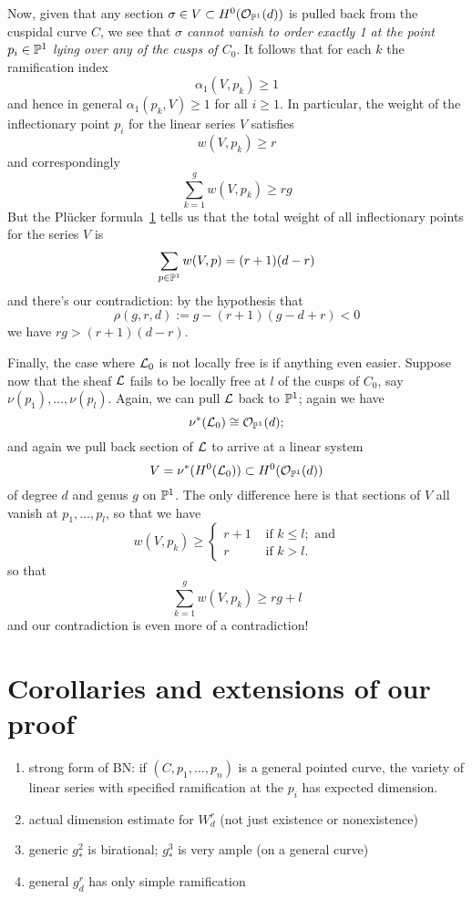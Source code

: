 Now, given that any section $\sigma \in V \subset H^0(\cO_{\PP^1}(d))$ is pulled back from the cuspidal curve $C$, we see that \emph{$\sigma$ cannot vanish to order exactly 1 at the point $p_i \in \PP^1$ lying over any of the cusps of $C_0$}. It follows that for each $k$ the ramification index 
$$
\alpha_1(V,p_k) \geq 1 
$$
and hence in  general $\alpha_1(p_k,V) \geq 1$ for all $i \geq 1$. In particular, the weight of the inflectionary point $p_i$ for the linear series $V$ satisfies
$$
w(V, p_k) \geq r
$$
and correspondingly
$$
\sum_{k=1}^g w(V, p_k) \geq rg
$$
But the Pl\"ucker formula~\ref{} tells us that the total weight of all inflectionary points for the series $V$ is
$$
\sum_{p \in \PP^1} w(V,p) = (r+1)(d-r)
$$
and there's our contradiction: by the hypothesis that 
$$
\rho(g,r,d) := g - (r+1)(g-d+r) < 0
$$
we have $rg > (r+1)(d-r)$.

Finally, the case where $\cL_0$ is not locally free is if anything even easier. Suppose now that the sheaf $\cL$ fails to be locally free at $l$ of the cusps of $C_0$, say $\nu(p_1),\dots,\nu(p_l)$. Again, we can pull $\cL$ back to $\PP^1$; again we have
$$
\nu^*(\cL_0) \cong \cO_{\PP^1}(d);
$$  
and again we pull back section of $\cL$ to arrive at a linear system
$$
V = \nu^*(H^0(\cL_0)) \subset H^0(\cO_{\PP^1}(d))
$$
of degree $d$ and genus $g$ on $\PP^1$. The only difference here is that sections of $V$ all vanish at $p_1,\dots,p_l$, so that we have
$$
w(V,p_k) \geq 
\begin{cases}
r+1 &\text{ if } k \leq l; \text{ and} \\
r  &\text{ if } k > l.
\end{cases}
$$
so that
$$
\sum_{k=1}^g w(V, p_k) \geq rg + l
$$
and our contradiction is even more of a contradiction!

\section{Corollaries and extensions of our proof}

\begin{enumerate}
\item strong form of BN: if $(C,p_1,\dots,p_n)$ is a general pointed curve, the variety of linear series with specified ramification at the $p_i$ has expected dimension.
\item actual dimension estimate for $W^r_d$ (not just existence or nonexistence)
\item generic $g^2_*$ is birational; $g^3_*$ is very ample (on a general curve)
\item general $g^r_d$ has only simple ramification
\end{enumerate}
